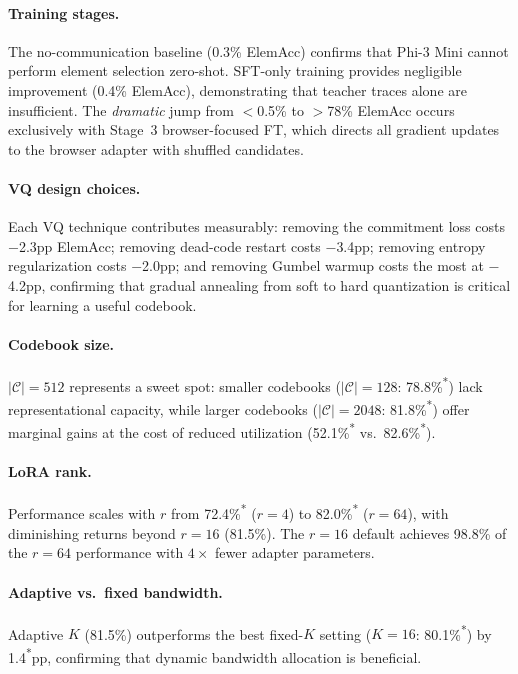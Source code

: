 \documentclass{article}
\newcommand{\tbd}[1]{#1\textsuperscript{*}}
\begin{document}
\paragraph{Training stages.}
The no-communication baseline (0.3\% ElemAcc) confirms that Phi-3 Mini cannot perform element selection zero-shot.
SFT-only training provides negligible improvement (0.4\% ElemAcc), demonstrating that teacher traces alone are insufficient.
The \emph{dramatic} jump from $<$0.5\% to $>$78\% ElemAcc occurs exclusively with Stage~3 browser-focused FT, which directs all gradient updates to the browser adapter with shuffled candidates.

\paragraph{VQ design choices.}
Each VQ technique contributes measurably: removing the commitment loss costs $-$2.3pp ElemAcc; removing dead-code restart costs $-$3.4pp; removing entropy regularization costs $-$2.0pp; and removing Gumbel warmup costs the most at $-$4.2pp, confirming that gradual annealing from soft to hard quantization is critical for learning a useful codebook.

\paragraph{Codebook size.}
$|\mathcal{C}|{=}512$ represents a sweet spot: smaller codebooks ($|\mathcal{C}|{=}128$: \tbd{78.8\%}) lack representational capacity, while larger codebooks ($|\mathcal{C}|{=}2048$: \tbd{81.8\%}) offer marginal gains at the cost of reduced utilization (\tbd{52.1\%} vs.\ \tbd{82.6\%}).

\paragraph{LoRA rank.}
Performance scales with $r$ from \tbd{72.4\%} ($r{=}4$) to \tbd{82.0\%} ($r{=}64$), with diminishing returns beyond $r{=}16$ (81.5\%).  The $r{=}16$ default achieves 98.8\% of the $r{=}64$ performance with $4\times$ fewer adapter parameters.

\paragraph{Adaptive vs.\ fixed bandwidth.}
Adaptive $K$ (81.5\%) outperforms the best fixed-$K$ setting ($K{=}16$: \tbd{80.1\%}) by \tbd{1.4}pp, confirming that dynamic bandwidth allocation is beneficial.
\end{document}
